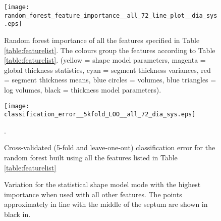 \documentclass{llncs}
\begin{document}
	
		\begin{figure}[]
		\begin{center}
		
		\texttt{[image: random\_forest\_feature\_importance\_\_all\_72\_line\_plot\_\_dia\_sys.eps]}
		
\caption{Random forest importance of all the features specified in Table \ref{table:featurelist}. The colours group the features according to Table \ref{table:featurelist}. (yellow = shape model parameters, magenta = global thickness statistics, cyan = segment thickness variances, red = segment thickness means, blue circles = volumes, blue triangles = log volumes, black = thickness model parameters).}
\label{fig:random_forest_feature_importance__all_72__dia_sys}		\end{center}
	\end{figure}
	
	\begin{figure}[]
	\begin{center}
	

		\texttt{[image: classification\_error\_\_5kfold\_LOO\_\_all\_72\_dia\_sys.eps]}
\caption{Cross-validated (5-fold and leave-one-out) classification error for the random forest built using all the features listed in Table \ref{table:featurelist}}.	
\label{fig:classification_error__5kfold_LOO__all_72_dia_sys}			\end{center}
		\end{figure}
		
	\begin{figure}[]	
	\!		
\begin{center}   
\qquad
{}


\caption{ Variation for the statistical shape model mode with the highest importance when used with all other features. The points approximately in line with the middle of the septum are shown in black in. }
\label{fig:visualise_shapes}
\end{center}
		\end{figure}
\end{document}
